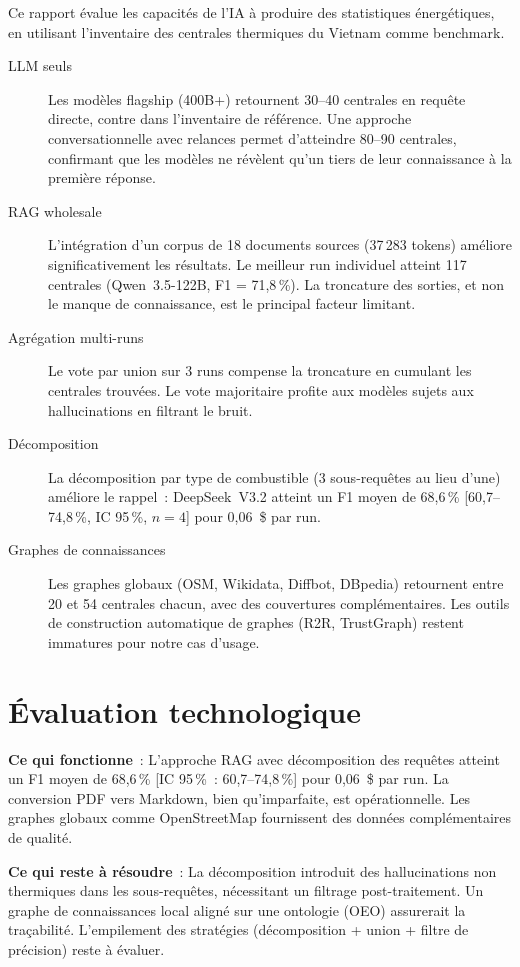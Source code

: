 \documentclass[a4paper,11pt]{report}
\begin{document}
Ce rapport évalue les capacités de l'IA à produire des statistiques énergétiques, en utilisant l'inventaire des centrales thermiques du Vietnam comme benchmark.

\begin{description}
\item[LLM seuls] Les modèles flagship (400B+) retournent 30--40 centrales en requête directe, contre \NumRefPlants{} dans l'inventaire de référence. Une approche conversationnelle avec relances permet d'atteindre 80--90 centrales, confirmant que les modèles ne révèlent qu'un tiers de leur connaissance à la première réponse.
\item[RAG wholesale] L'intégration d'un corpus de 18 documents sources (37\,283 tokens) améliore significativement les résultats. Le meilleur run individuel atteint 117 centrales (Qwen~3.5-122B, F1 = 71,8\,\%). La troncature des sorties, et non le manque de connaissance, est le principal facteur limitant.
\item[Agrégation multi-runs] Le vote par union sur 3 runs compense la troncature en cumulant les centrales trouvées. Le vote majoritaire profite aux modèles sujets aux hallucinations en filtrant le bruit.
\item[Décomposition] La décomposition par type de combustible (3 sous-requêtes au lieu d'une) améliore le rappel~: DeepSeek~V3.2 atteint un F1 moyen de 68,6\,\% [60,7--74,8\,\%, IC 95\,\%, $n=4$] pour 0,06~\$ par run.
\item[Graphes de connaissances] Les graphes globaux (OSM, Wikidata, Diffbot, DBpedia) retournent entre 20 et 54 centrales chacun, avec des couvertures complémentaires. Les outils de construction automatique de graphes (R2R, TrustGraph) restent immatures pour notre cas d'usage.
\end{description}


\section{Évaluation technologique}

\textbf{Ce qui fonctionne}~: L'approche RAG avec décomposition des requêtes atteint un F1 moyen de 68,6\,\% [IC 95\,\%~: 60,7--74,8\,\%] pour 0,06~\$ par run. La conversion PDF vers Markdown, bien qu'imparfaite, est opérationnelle. Les graphes globaux comme OpenStreetMap fournissent des données complémentaires de qualité.

\textbf{Ce qui reste à résoudre}~: La décomposition introduit des hallucinations non thermiques dans les sous-requêtes, nécessitant un filtrage post-traitement. Un graphe de connaissances local aligné sur une ontologie (OEO) assurerait la traçabilité. L'empilement des stratégies (décomposition + union + filtre de précision) reste à évaluer.
\end{document}
